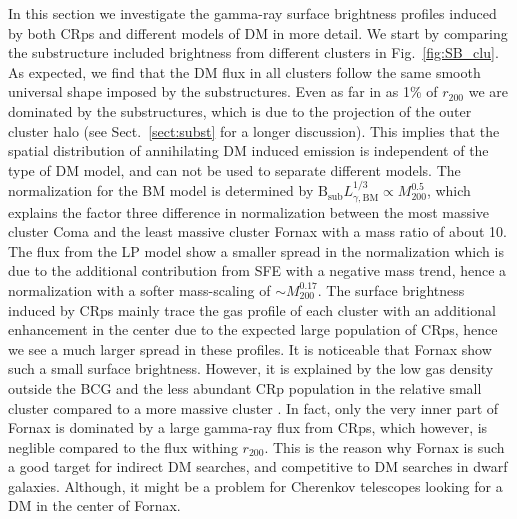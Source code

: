 \documentclass[10pt,aps,pra,reprint,amsmath,amsfonts,amssymb,showpacs]{revtex4-1}
\newcommand{\rmn}{\mathrm}
\newcommand{\B}{\rmn{B}}
\newcommand{\bsub}{\B_\rmn{sub}}
\newcommand{\rvir}{r_{200}}
\newcommand{\mvir}{M_{200}}
\begin{document}
In this section we investigate the gamma-ray surface brightness
profiles induced by both CRps and different models of DM in more
detail. We start by comparing the substructure included brightness
from different clusters in Fig.~\ref{fig:SB_clu}. As expected, we find
that the DM flux in all clusters follow the same smooth universal
shape imposed by the substructures. Even as far in as 1\% of $\rvir$
we are dominated by the substructures, which is due to the projection
of the outer cluster halo (see Sect.~\ref{sect:subst} for a longer
discussion). This implies that the spatial distribution of
annihilating DM induced emission is independent of the type of DM
model, and can not be used to separate different models. The
normalization for the BM model is determined by $\bsub
L_{\gamma,\rmn{BM}}^{1/3} \propto \mvir^{0.5}$, which explains the
factor three difference in normalization between the most massive
cluster Coma and the least massive cluster Fornax with a mass ratio of
about 10. The flux from the LP model show a smaller spread in the
normalization which is due to the additional contribution from SFE
with a negative mass trend, hence a normalization with a softer
mass-scaling of $\sim\mvir^{0.17}$. The surface brightness induced by
CRps mainly trace the gas profile of each cluster with an additional
enhancement in the center due to the expected large population of
CRps, hence we see a much larger spread in these profiles. It is
noticeable that Fornax show such a small surface brightness. However,
it is explained by the low gas density outside the BCG and the less
abundant CRp population in the relative small cluster compared to a
more massive cluster \cite{2010MNRAS.409..449P}. In fact, only the
very inner part of Fornax is dominated by a large gamma-ray flux from
CRps, which however, is neglible compared to the flux withing
$\rvir$. This is the reason why Fornax is such a good target for
indirect DM searches, and competitive to DM searches in dwarf
galaxies. Although, it might be a problem for Cherenkov telescopes
looking for a DM in the center of Fornax.
\end{document}
